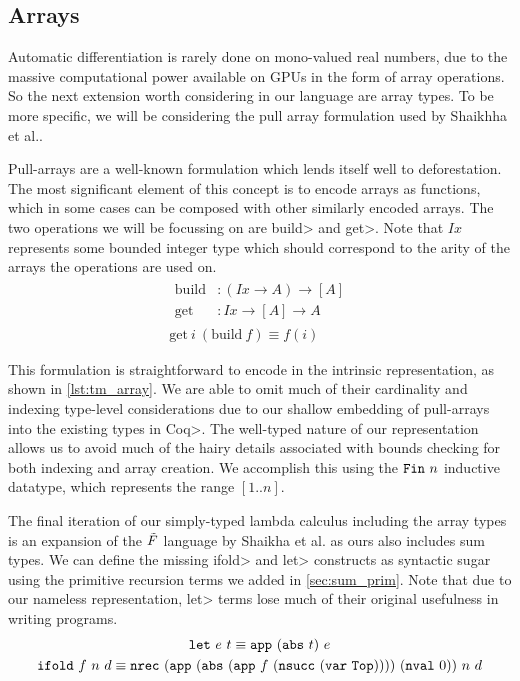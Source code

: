 \subsection{Arrays}\label{sec:arrays}
  Automatic differentiation is rarely done on mono-valued real numbers, due to the massive computational power available on GPUs in the form of array operations.
  So the next extension worth considering in our language are array types.
  To be more specific, we will be considering the pull array formulation used by Shaikhha et al.\cite{Shaikha2019}.

  Pull-arrays are a well-known formulation which lends itself well to deforestation\cite{10.1145/165180.165214}.
  The most significant element of this concept is to encode arrays as functions, which in some cases can be composed with other similarly encoded arrays.
  The two operations we will be focussing on are \<build> and \<get>.
  Note that $Ix$ represents some bounded integer type which should correspond to the arity of the arrays the operations are used on.
  \begin{gather*}
    \begin{aligned}
      \text{build} &: (Ix \rightarrow A) \rightarrow [A] \\
      \text{get} &: Ix \rightarrow [A] \rightarrow A
    \end{aligned} \\
    \text{get}\ i\ (\text{build}\ f) \equiv f(i)
  \end{gather*}

  This formulation is straightforward to encode in the intrinsic representation, as shown in \cref{lst:tm_array}.
  We are able to omit much of their cardinality and indexing type-level considerations due to our shallow embedding of pull-arrays into the existing types in \<Coq>.
  The well-typed nature of our representation allows us to avoid much of the hairy details associated with bounds checking for both indexing and array creation.
  We accomplish this using the $\texttt{Fin}\ n$ inductive datatype, which represents the range $[1..n]$.

  The final iteration of our simply-typed lambda calculus including the array types is an expansion of the $\tilde{F}$ language by Shaikha et al. as ours also includes sum types.
  We can define the missing \<ifold> and \<let> constructs as syntactic sugar using the primitive recursion terms we added in \cref{sec:sum_prim}.
  Note that due to our nameless representation, \<let> terms lose much of their original usefulness in writing programs.
  \begin{gather*}
    \texttt{let}\ e\ t \equiv \texttt{app}\ (\texttt{abs}\ t)\ e \\
    \texttt{ifold}\ f\ n\ d \equiv
    \texttt{nrec}\ (\texttt{app}\ (\texttt{abs}\ (\texttt{app}\ f\ (\texttt{nsucc}\ (\texttt{var}\ \texttt{Top}))))\ (\texttt{nval}\ 0))\ n\ d
  \end{gather*}

